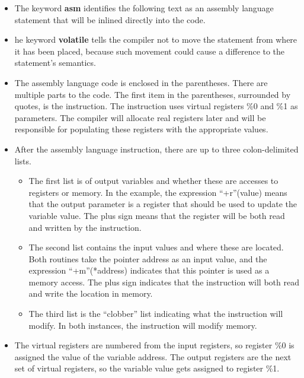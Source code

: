 \documentclass[12pt,a4paper]{report}
\begin{document}
\begin{itemize}
	\item The keyword \textbf{asm} identifies the following text as an assembly language statement that will be inlined directly into the code. 
	\item he keyword \textbf{volatile} tells the compiler not to move the statement from where it has been placed, because such movement could cause a difference to the statement's semantics.
	\item The assembly language code is enclosed in the parentheses. There are multiple parts to the code. The first item in the parentheses, surrounded by quotes, is the instruction. The instruction uses virtual registers \%0 and \%1 as parameters. The compiler will allocate real registers later and will be responsible for populating these registers with the appropriate values.
	\item After the assembly language instruction, there are up to three colon-delimited lists. 
	\begin{itemize}
		\item The first list is of output variables and whether these are accesses to registers or memory. In the example, the expression ``+r''(value) means that the output parameter is a register that should be used to update the variable value. The plus sign means that the register will be both read and written by the instruction.
		\item 	The second list contains the input values and where these are located. Both routines take the pointer address as an input value, and the expression ``+m''(*address) indicates that this pointer is used as a memory access. The plus sign indicates that the instruction will both read and write the location in memory.
		\item The third list is the ``clobber'' list indicating what the instruction will modify. In both instances, the instruction will modify memory.
	\end{itemize}
	\item The virtual registers are numbered from the input registers, so register \%0 is assigned the value of the variable address. The output registers are the next set of virtual registers, so the variable value gets assigned to register \%1.
\end{itemize}
\end{document}
